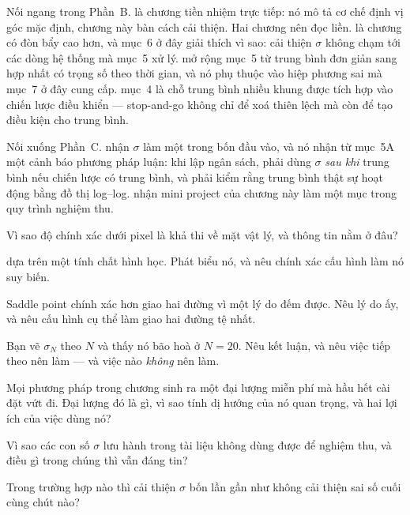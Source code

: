 \documentclass[../../marker.tex]{subfiles}
\begin{document}
Nối ngang trong Phần~B.  là chương tiền nhiệm trực tiếp: nó mô tả cơ chế định vị góc mặc định, chương này bàn cách cải thiện. Hai chương nên đọc liền.  là chương có đòn bẩy cao hơn, và mục~6 ở đây giải thích vì sao: cải thiện \(\sigma\) không chạm tới các dòng hệ thống mà  mục~5 xử lý.  mở rộng mục~5 từ trung bình đơn giản sang hợp nhất có trọng số theo thời gian, và nó phụ thuộc vào hiệp phương sai mà mục~7 ở đây cung cấp.  mục~4 là chỗ trung bình nhiều khung được tích hợp vào chiến lược điều khiển --- stop-and-go không chỉ để xoá thiên lệch mà còn để tạo điều kiện cho trung bình.

Nối xuống Phần~C.  nhận \(\sigma\) làm một trong bốn đầu vào, và nó nhận từ mục~5A một cảnh báo phương pháp luận: khi lập ngân sách, phải dùng \(\sigma\) \emph{sau khi} trung bình nếu chiến lược có trung bình, và phải kiểm rằng trung bình thật sự hoạt động bằng đồ thị log--log.  nhận mini project của chương này làm một mục trong quy trình nghiệm thu.

\begin{tukiem}
\item Vì sao độ chính xác dưới pixel là khả thi về mặt vật lý, và thông tin nằm ở đâu?
\item {} dựa trên một tính chất hình học. Phát biểu nó, và nêu chính xác cấu hình làm nó suy biến.
\item Saddle point chính xác hơn giao hai đường vì một lý do đếm được. Nêu lý do ấy, và nêu cấu hình cụ thể làm giao hai đường tệ nhất.
\item Bạn vẽ \(\sigma_N\) theo \(N\) và thấy nó bão hoà ở \(N = 20\). Nêu kết luận, và nêu việc tiếp theo nên làm --- và việc nào \emph{không} nên làm.
\item Mọi phương pháp trong chương sinh ra một đại lượng miễn phí mà hầu hết cài đặt vứt đi. Đại lượng đó là gì, vì sao tính dị hướng của nó quan trọng, và hai lợi ích của việc dùng nó?
\item Vì sao các con số \(\sigma\) lưu hành trong tài liệu không dùng được để nghiệm thu, và điều gì trong chúng thì vẫn đáng tin?
\item Trong trường hợp nào thì cải thiện \(\sigma\) bốn lần gần như không cải thiện sai số cuối cùng chút nào?
\end{tukiem}
\ifSubfilesClassLoaded{\printbibliography[title={Nguồn}]}{}
\end{document}
